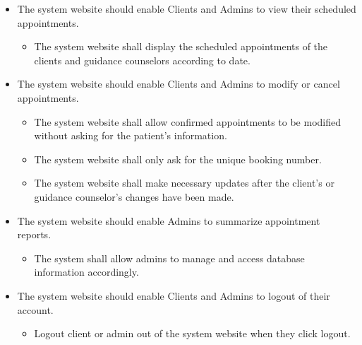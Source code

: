 \begin{enumerate}
\begin{itemize}
		\item The system website should enable Clients and Admins to view their scheduled appointments. 
			\begin{itemize}
			\item The system website shall display the scheduled appointments of the clients and guidance counselors according to date. 
			\end{itemize}
		\item The system website should enable Clients and Admins to modify or cancel appointments. 
			\begin{itemize}
			\item The system website shall allow confirmed appointments to be modified without asking for the patient's information. 
			\item The system website shall only ask for the unique booking number. 
			\item The system website shall make necessary updates after the client’s or guidance counselor’s changes have been made. 
			\end{itemize}
		\item The system website should enable Admins to summarize appointment reports. 
			\begin{itemize}
			\item The system shall allow admins to manage and access database information accordingly. 
			\end{itemize}
		\item The system website should enable Clients and Admins to logout of their account. 
			\begin{itemize}
			\item Logout client or admin out of the system website when they click logout. 
			\end{itemize}
		\end{itemize}
	\end{enumerate}


